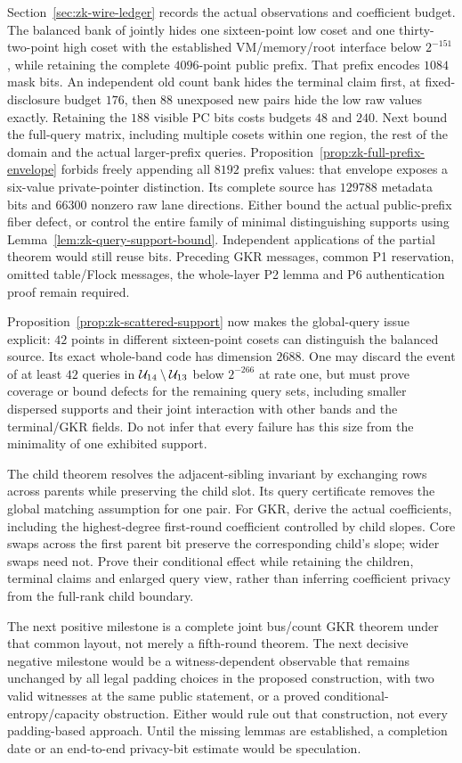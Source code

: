 Section~\ref{sec:zk-wire-ledger} records the actual observations and coefficient budget. The balanced bank of  jointly hides one sixteen-point low coset and one thirty-two-point high coset with the established VM/memory/root interface below $2^{-151}$, while retaining the complete $4096$-point public prefix. That prefix encodes $1084$ mask bits. An independent old count bank hides the terminal claim first, at fixed-disclosure budget $176$, then $88$ unexposed new pairs hide the low raw values exactly. Retaining the $188$ visible PC bits costs budgets $48$ and $240$. Next bound the full-query matrix, including multiple cosets within one region, the rest of the domain and the actual larger-prefix queries. Proposition~\ref{prop:zk-full-prefix-envelope} forbids freely appending all $8192$ prefix values: that envelope exposes a six-value private-pointer distinction. Its complete source has $129788$ metadata bits and $66300$ nonzero raw lane directions. Either bound the actual public-prefix fiber defect, or control the entire family of minimal distinguishing supports using Lemma~\ref{lem:zk-query-support-bound}. Independent applications of the partial theorem would still reuse bits. Preceding GKR messages, common P1 reservation, omitted table/Flock messages, the whole-layer P2 lemma and P6 authentication proof remain required.

Proposition~\ref{prop:zk-scattered-support} now makes the global-query issue explicit: $42$ points in different sixteen-point cosets can distinguish the balanced source. Its exact whole-band code has dimension $2688$. One may discard the event of at least $42$ queries in $\mathcal{U}_{14}\setminus\mathcal{U}_{13}$ below $2^{-266}$ at rate one, but must prove coverage or bound defects for the remaining query sets, including smaller dispersed supports and their joint interaction with other bands and the terminal/GKR fields. Do not infer that every failure has this size from the minimality of one exhibited support.

The child theorem resolves the adjacent-sibling invariant by exchanging rows across parents while preserving the child slot. Its query certificate removes the global matching assumption for one pair. For GKR, derive the actual coefficients, including the highest-degree first-round coefficient controlled by child slopes. Core swaps across the first parent bit preserve the corresponding child's slope; wider swaps need not. Prove their conditional effect while retaining the children, terminal claims and enlarged query view, rather than inferring coefficient privacy from the full-rank child boundary.

The next positive milestone is a complete joint bus/count GKR theorem under that common layout, not merely a fifth-round theorem. The next decisive negative milestone would be a witness-dependent observable that remains unchanged by all legal padding choices in the proposed construction, with two valid witnesses at the same public statement, or a proved conditional-entropy/capacity obstruction. Either would rule out that construction, not every padding-based approach. Until the missing lemmas are established, a completion date or an end-to-end privacy-bit estimate would be speculation.
